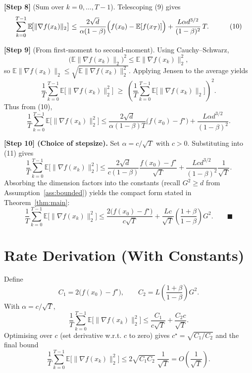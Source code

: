 \documentclass{article}
\newcommand{\E}{\mathbb{E}}
\begin{document}
\noindent\textbf{[Step 8]} (Sum over $k=0,\dots,T-1$).  
Telescoping (9) gives
\[
\begin{aligned}
\sum_{k=0}^{T-1}\E\!\big[\|\nabla f(x_{k})\|_{2}\big]
&\le \frac{2\sqrt d}{\alpha(1-\beta)}
\Bigl( f(x_{0})- \E[f(x_{T})]\Bigr)
+\frac{L\alpha d^{3/2}}{(1-\beta)^{2}}\,T .
\end{aligned}
\tag{10}
\]

\noindent\textbf{[Step 9]} (From first‑moment to second‑moment).  
Using Cauchy–Schwarz,
\[
\bigl(\E\|\nabla f(x_{k})\|_{2}\bigr)^{2}\le \E\|\nabla f(x_{k})\|_{2}^{2},
\]
so $\E\|\nabla f(x_{k})\|_{2}\le\sqrt{\E\|\nabla f(x_{k})\|_{2}^{2}}$.  
Applying Jensen to the average yields
\[
\frac{1}{T}\sum_{k=0}^{T-1}\E\!\big[\|\nabla f(x_{k})\|_{2}^{2}\big]
\;\ge\;
\left(\frac{1}{T}\sum_{k=0}^{T-1}\E\!\big[\|\nabla f(x_{k})\|_{2}\big]\right)^{2}.
\]
Thus from (10),
\[
\frac{1}{T}\sum_{k=0}^{T-1}\E\!\big[\|\nabla f(x_{k})\|_{2}^{2}\big]
\le
\frac{2\sqrt d}{\alpha(1-\beta)T}
\bigl(f(x_{0})-f^{\star}\bigr)
+\frac{L\alpha d^{3/2}}{(1-\beta)^{2}}.
\tag{11}
\]

\noindent\textbf{[Step 10] (Choice of stepsize).}  
Set $\alpha = c/\sqrt{T}$ with $c>0$. Substituting into (11) gives
\[
\frac{1}{T}\sum_{k=0}^{T-1}\E\!\big[\|\nabla f(x_{k})\|_{2}^{2}\big]
\le
\frac{2\sqrt d}{c(1-\beta)}\frac{f(x_{0})-f^{\star}}{\sqrt{T}}
+\frac{L c d^{3/2}}{(1-\beta)^{2}}\frac{1}{\sqrt{T}}.
\]
Absorbing the dimension factors into the constants (recall $G^{2}\ge d$ from Assumption~\ref{ass:bounded}) yields the compact form stated in Theorem~\ref{thm:main}:
\[
\frac{1}{T}\sum_{k=0}^{T-1}\E\!\big[\|\nabla f(x_{k})\|_{2}^{2}\big]
\le
\frac{2\big(f(x_{0})-f^{\star}\big)}{c\sqrt{T}}
+\frac{L c}{\sqrt{T}}\left(\frac{1+\beta}{1-\beta}\right)G^{2}.
\qquad\blacksquare
\]

\section*{Rate Derivation (With Constants)}
Define
\[
C_{1}=2\big(f(x_{0})-f^{\star}\big),\qquad
C_{2}=L\left(\frac{1+\beta}{1-\beta}\right)G^{2}.
\]
With $\alpha=c/\sqrt{T}$,
\[
\frac{1}{T}\sum_{k=0}^{T-1}\E\!\big[\|\nabla f(x_{k})\|_{2}^{2}\big]
\le \frac{C_{1}}{c\sqrt{T}}+\frac{C_{2}c}{\sqrt{T}}.
\]
Optimising over $c$ (set derivative w.r.t. $c$ to zero) gives $c^{\star}= \sqrt{C_{1}/C_{2}}$ and the final bound
\[
\frac{1}{T}\sum_{k=0}^{T-1}\E\!\big[\|\nabla f(x_{k})\|_{2}^{2}\big]
\le 2\sqrt{C_{1}C_{2}}\;\frac{1}{\sqrt{T}}
= O\!\left(\frac{1}{\sqrt{T}}\right).
\]
\end{document}
